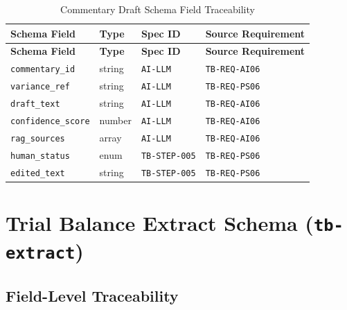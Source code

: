 \documentclass[11pt,a4paper,twoside]{report}
\newcommand{\reqref}[1]{\texttt{#1}}
\newcommand{\specref}[1]{\texttt{#1}}
\newcommand{\schemaref}[1]{\texttt{#1}}
\newcommand{\fieldref}[1]{\textcolor{sapblue}{\texttt{#1}}}
\begin{document}
\begin{longtable}{@{}L{4cm}L{2.5cm}C{2cm}L{4.5cm}@{}}
\caption{Commentary Draft Schema Field Traceability}
\label{tab:commentary-draft-fields} \\
\toprule
\textbf{Schema Field} & \textbf{Type} & \textbf{Spec ID} & \textbf{Source Requirement} \\
\midrule
\endfirsthead
\toprule
\textbf{Schema Field} & \textbf{Type} & \textbf{Spec ID} & \textbf{Source Requirement} \\
\midrule
\endhead
\fieldref{commentary\_id} & string & \specref{AI-LLM} & \reqref{TB-REQ-AI06} \\
\fieldref{variance\_ref} & string & \specref{AI-LLM} & \reqref{TB-REQ-PS06} \\
\fieldref{draft\_text} & string & \specref{AI-LLM} & \reqref{TB-REQ-AI06} \\
\fieldref{confidence\_score} & number & \specref{AI-LLM} & \reqref{TB-REQ-AI06} \\
\fieldref{rag\_sources} & array & \specref{AI-LLM} & \reqref{TB-REQ-AI06} \\
\fieldref{human\_status} & enum & \specref{TB-STEP-005} & \reqref{TB-REQ-PS06} \\
\fieldref{edited\_text} & string & \specref{TB-STEP-005} & \reqref{TB-REQ-PS06} \\
\bottomrule
\end{longtable}

\section{Trial Balance Extract Schema (\schemaref{tb-extract})}
\label{sec:tb-extract-schema}

\subsection{Field-Level Traceability}
\end{document}
